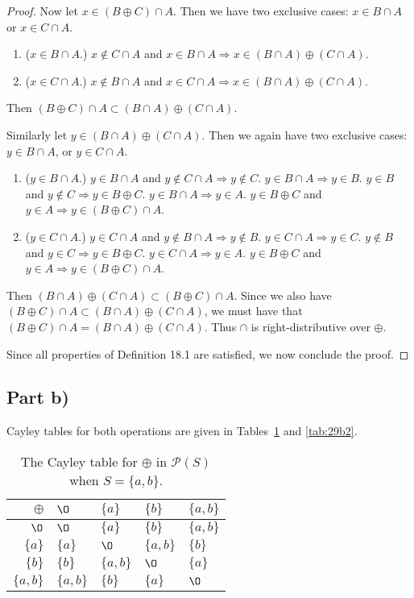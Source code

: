 \documentclass{abrice}
\renewcommand{\P}{\mathscr{P}}
\begin{document}
\begin{proof}
  Now let $x \in (B \oplus C) \cap A$. Then we have two exclusive cases: $x \in
  B \cap A$ or $x \in C \cap A$.
  \begin{enumerate}[label=\emph{\roman*})]
  \item ($x \in B \cap A$.) $x \notin C \cap A$ and $x \in B \cap A \Rightarrow
    x \in (B \cap A) \oplus (C \cap A)$.
  \item ($x \in C \cap A$.) $x \notin B \cap A$ and $x \in C \cap A \Rightarrow
    x \in (B \cap A) \oplus (C \cap A)$.
  \end{enumerate}
  Then $(B \oplus C) \cap A \subset (B \cap A) \oplus (C \cap A)$.

  Similarly let $y \in (B \cap A) \oplus (C \cap A)$. Then we again have two
  exclusive cases: $y \in B \cap A$, or $y \in C \cap A$.
  \begin{enumerate}[label=\emph{\roman*})]
  \item ($y \in B \cap A$.) $y \in B \cap A$ and $y \notin C \cap A \Rightarrow
    y \notin C$. $y \in B \cap A \Rightarrow y \in B$. $y \in B$ and $y \notin C
    \Rightarrow y \in B \oplus C$. $y \in B \cap A \Rightarrow y \in A$. $y \in
    B \oplus C$ and $y \in A \Rightarrow y \in (B \oplus C) \cap A$.
  \item ($y \in C \cap A$.) $y \in C \cap A$ and $y \notin B \cap A \Rightarrow
    y \notin B$. $y \in C \cap A \Rightarrow y \in C$. $y \notin B$ and $y \in C
    \Rightarrow y \in B \oplus C$. $y \in C \cap A \Rightarrow y \in A$. $y \in
    B \oplus C$ and $y \in A \Rightarrow y \in (B \oplus C) \cap A$.
  \end{enumerate}
  Then $(B \cap A) \oplus (C \cap A) \subset (B \oplus C) \cap A$. Since we also
  have $(B \oplus C) \cap A \subset (B \cap A) \oplus (C \cap A)$, we must have
  that $(B \oplus C) \cap A = (B \cap A) \oplus (C \cap A)$. Thus $\cap$ is
  right-distributive over $\oplus$.

  Since all properties of Definition 18.1 are satisfied, we now conclude the proof.
\end{proof}

\subsection{Part b)}

Cayley tables for both operations are given in Tables~\ref{tab:29b1} and \ref{tab:29b2}.

\begin{table}
  \centering
  \begin{tabular}{r|llll}
    $\oplus$ & $\O$ & $\{a\}$ & $\{b\}$ & $\{a,b\}$ \\
    \midrule
    $\O$ & $\O$ & $\{a\}$ & $\{b\}$ & $\{a,b\}$ \\
    $\{a\}$ & $\{a\}$ & $\O$ & $\{a,b\}$ & $\{b\}$ \\
    $\{b\}$ & $\{b\}$ & $\{a,b\}$ & $\O$ & $\{a\}$ \\
    $\{a,b\}$ & $\{a,b\}$ & $\{b\}$ & $\{a\}$ & $\O$
  \end{tabular}
  \caption{The Cayley table for $\oplus$ in $\P(S)$ when $S = \{a,b\}$.}
  \label{tab:29b1}
\end{table}
\end{document}
